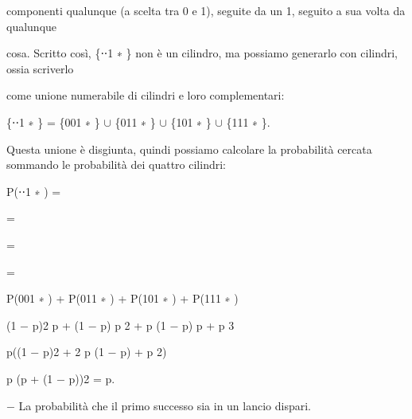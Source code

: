 \documentclass[a4paper,portrait,12pt]{article}
\begin{document}
\begin{flushleft}
componenti qualunque (a scelta tra 0 e 1), seguite da un 1, seguito a sua volta da qualunque
\end{flushleft}


\begin{flushleft}
cosa. Scritto così, \{⋅⋅1 ∗ \} non \`{e} un cilindro, ma possiamo generarlo con cilindri, ossia scriverlo
\end{flushleft}


\begin{flushleft}
come unione numerabile di cilindri e loro complementari:
\end{flushleft}


\{⋅⋅1 ∗ \} = \{001 ∗ \} $\cup$ \{011 ∗ \} $\cup$ \{101 ∗ \} $\cup$ \{111 ∗ \}.


\begin{flushleft}
Questa unione \`{e} disgiunta, quindi possiamo calcolare la probabilit\`{a} cercata sommando le probabilit\`{a} dei quattro cilindri:
\end{flushleft}


\begin{flushleft}
P(⋅⋅1 ∗ ) =
\end{flushleft}


=


=


=





\begin{flushleft}
P(001 ∗ ) + P(011 ∗ ) + P(101 ∗ ) + P(111 ∗ )
\end{flushleft}


\begin{flushleft}
(1 $-$ p)2 p + (1 $-$ p) p 2 + p (1 $-$ p) p + p 3
\end{flushleft}


\begin{flushleft}
p((1 $-$ p)2 + 2 p (1 $-$ p) + p 2)
\end{flushleft}


\begin{flushleft}
p (p + (1 $-$ p))2 = p.
\end{flushleft}





\begin{flushleft}
$-$ La probabilit\`{a} che il primo successo sia in un lancio dispari.
\end{flushleft}
\end{document}
